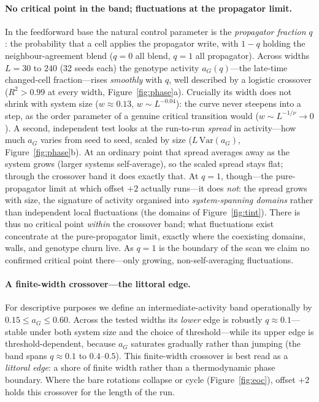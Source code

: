 \documentclass[man,12pt,floatsintext]{apa7}
\begin{document}
\paragraph{No critical point in the band; fluctuations at the propagator limit.}
In the feedforward base the natural control parameter is the \emph{propagator
fraction} $q$: the probability that a cell applies the propagator write, with
$1-q$ holding the neighbour-agreement blend ($q = 0$ all blend, $q = 1$ all
propagator). Across widths $L = 30$ to $240$ (32 seeds each) the genotype activity
$a_G(q)$---the late-time changed-cell fraction---rises \emph{smoothly} with $q$,
well described by a logistic crossover ($R^2 > 0.99$ at every width,
Figure~\ref{fig:phase}a). Crucially its width does not shrink with system size
($w \approx 0.13$, $w \sim L^{-0.04}$): the curve never steepens into a step, as
the order parameter of a genuine critical transition would
($w \sim L^{-1/\nu} \to 0$). A second, independent test looks at the run-to-run
\emph{spread} in activity---how much $a_G$ varies from seed to seed, scaled by
size ($L\,\mathrm{Var}(a_G)$, Figure~\ref{fig:phase}b). At an ordinary point that
spread averages away as the system grows (larger systems self-average), so the
scaled spread stays flat; through the crossover band it does exactly that. At
$q = 1$, though---the pure-propagator limit at which offset $+2$ actually runs---it
does \emph{not}: the spread grows with size, the signature of activity organised
into \emph{system-spanning domains} rather than independent local fluctuations
(the domains of Figure~\ref{fig:tint}). There is thus no critical point
\emph{within} the crossover band; what fluctuations exist concentrate at the
pure-propagator limit, exactly where the coexisting domains, walls, and genotype
churn live. As $q = 1$ is the boundary of the scan we claim no confirmed critical
point there---only growing, non-self-averaging fluctuations.

\paragraph{A finite-width crossover---the littoral edge.}
For descriptive purposes we define an intermediate-activity band operationally by
$0.15 \le a_G \le 0.60$. Across the tested widths its \emph{lower} edge is
robustly $q \approx 0.1$---stable under both system size and the choice of
threshold---while its upper edge is threshold-dependent, because $a_G$ saturates
gradually rather than jumping (the band spans $q \approx 0.1$ to $0.4$--$0.5$).
This finite-width crossover is best read as a \emph{littoral edge}: a shore of
finite width rather than a thermodynamic phase boundary. Where the bare rotations collapse or cycle
(Figure~\ref{fig:eoc}), offset $+2$ holds this crossover for the length of the
run.
\end{document}
